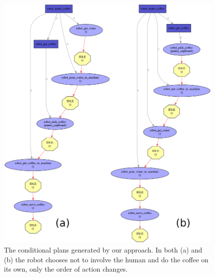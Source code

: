 \documentclass[a4paper,11pt,twoside]{StyleThese}
\begin{document}
\begin{figure}[hbtp]
\centering
\includegraphics[width=\textwidth]{figures/chapter4/Chapt4SimplePlanHierarchy.png}
\caption{The conditional plans generated by our approach. In both (a) and (b) the robot chooses not to involve the human and do the coffee on its own, only the order of action changes.}
\label{fig:chap4coffeesimplerobotonly}
\end{figure}
\end{document}
